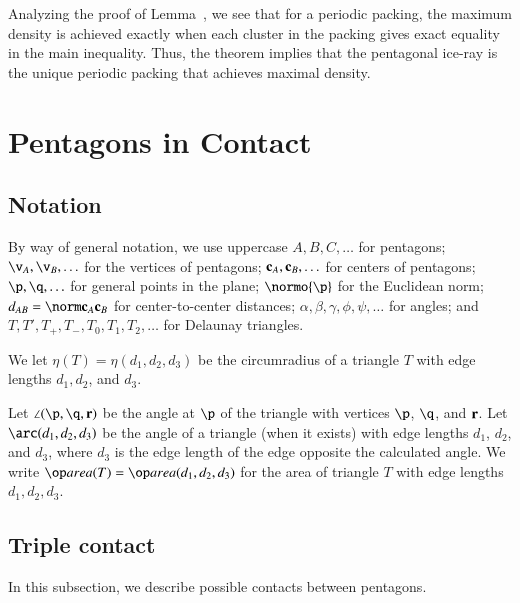 \begin{remark}
Analyzing the proof of Lemma~, we see that for a
periodic packing, the maximum density is achieved exactly when each
 cluster in the packing gives exact equality in the main inequality.
Thus, the theorem implies that the pentagonal ice-ray  is the
unique periodic packing that achieves maximal density.
\end{remark}



\section{Pentagons in Contact}


\subsection{Notation}

By way of general notation, we use uppercase $A,B,C,\ldots$ for
pentagons; $\v_A,\v_B,\ldots$ for the vertices of pentagons;
${\mathbf c}_A,{\mathbf c}_B,\ldots$ for centers of pentagons; $\p,\q,\ldots$ for
general points in the plane; $\normo{\p}$ for the Euclidean norm;
$\dx{AB}=\dd{A}{B}$ for center-to-center distances;
$\alpha,\beta,\gamma,\phi,\psi,\ldots$ for angles; and
$T,T',T_+,T_-,T_0,T_1,T_2,\ldots$ for Delaunay triangles.

We let $\eta(T) = \eta(d_1,d_2,d_3)$ be the circumradius of a triangle
$T$ with edge lengths $d_1,d_2$, and $d_3$.

Let $\angle(\p,\q,\r)$ be the angle at $\p$ of the triangle with
vertices $\p$, $\q$, and ${\mathbf r}$.  Let $\arc(d_1,d_2,d_3)$ be the angle
of a triangle (when it exists) with edge lengths $d_1$, $d_2$, and
$d_3$, where $d_3$ is the edge length of the edge opposite the
calculated angle.  We write $\area(T)= \area(d_1,d_2,d_3)$ for the
area of triangle $T$ with edge lengths $d_1,d_2,d_3$.


\subsection{Triple contact}

In this subsection, we describe possible contacts between pentagons.


